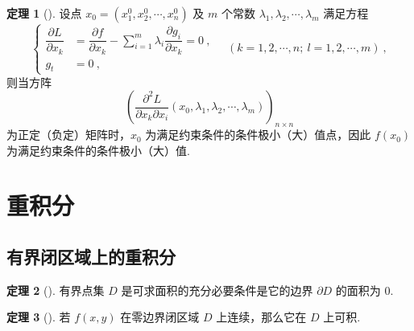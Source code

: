 \documentclass[zihao=-4,linespread=1.8,UTF8,nothm]{aytony_base}
\theoremstyle{definition}
\newtheorem{theorem}{\indent\heiti\textbf{定理}}[subsection]
\begin{document}
\begin{theorem}[]
    设点 $x_0 = (x^0_1, x^0_2, \cdots, x^0_{n})$ 及 $m$ 个常数 ${\lambda}_1, {\lambda}_2, \cdots, {\lambda}_{m}$ 满足方程 $$
        \left\{
        \begin{aligned}
            \dfrac{\partial L}{\partial x_k} & = \dfrac{\partial f}{\partial x_k} - \sum\limits_{i = 1}^{m}\lambda_i \dfrac{\partial g_i}{\partial x_k} = 0\ , \\
            g_t                              & = 0\ ,
        \end{aligned}
        \right.\quad (k = 1, 2, \cdots, n;\ l = 1 ,2, \cdots, m)\ ,
    $$ 则当方阵 $$
        \left(\dfrac{\partial^2L}{\partial x_k \partial x_i}(x_0, {\lambda}_1, {\lambda}_2, \cdots, {\lambda}_{m})\right)_{n \times n}
    $$ 为正定（负定）矩阵时，$x_0$ 为满足约束条件的条件极小（大）值点，因此 $f(x_0)$ 为满足约束条件的条件极小（大）值.
\end{theorem}

\section{重积分}

\subsection{有界闭区域上的重积分}

\begin{theorem}[]
    有界点集 $D$ 是可求面积的充分必要条件是它的边界 $\partial D$ 的面积为 $0$.
\end{theorem}

\begin{theorem}[]
    若 $f(x, y)$ 在零边界闭区域 $D$ 上连续，那么它在 $D$ 上可积.
\end{theorem}
\end{document}
